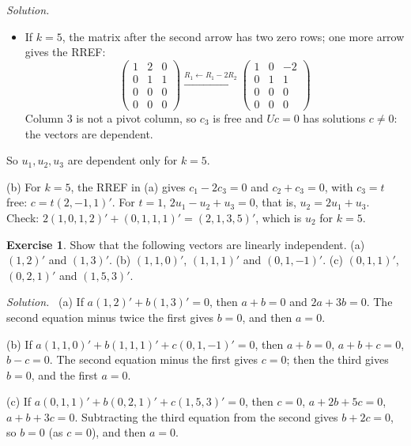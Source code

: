\documentclass[12pt]{article}
\theoremstyle{definition}
\newtheorem{exercise}{Exercise}
\newenvironment{solution}{\par\noindent\textit{Solution.}\ }{\par\smallskip}
\begin{document}
\begin{solution}
\begin{itemize}
\(c=0\) is the only solution (Theorem~\ref{thm:r2-solution-structure}(b)), and \(u_1,u_2,u_3\) are
independent.
\item If \(k=5\), the matrix after the second arrow has two zero rows; one more arrow gives the
RREF:
\[
\begin{pmatrix}1&2&0\\0&1&1\\0&0&0\\0&0&0\end{pmatrix}
\xrightarrow{R_1\leftarrow R_1-2R_2}
\begin{pmatrix}1&0&-2\\0&1&1\\0&0&0\\0&0&0\end{pmatrix}
\]
Column \(3\) is not a pivot column, so \(c_3\) is free and \(Uc=0\) has solutions \(c\ne0\): the
vectors are dependent.
\end{itemize}
So \(u_1,u_2,u_3\) are dependent only for \(k=5\).

(b) For \(k=5\), the RREF in (a) gives \(c_1-2c_3=0\) and \(c_2+c_3=0\), with \(c_3=t\) free: \(c=t(2,-1,1)'\). For \(t=1\),
\(2u_1-u_2+u_3=0\), that is, \(u_2=2u_1+u_3\). Check: \(2(1,0,1,2)'+(0,1,1,1)'=(2,1,3,5)'\), which is
\(u_2\) for \(k=5\).
\end{solution}

\begin{exercise}\label{r3-ex-independent-examples}
Show that the following vectors are linearly independent.
(a) \((1,2)'\) and \((1,3)'\).
(b) \((1,1,0)'\), \((1,1,1)'\) and \((0,1,-1)'\).
(c) \((0,1,1)'\), \((0,2,1)'\) and \((1,5,3)'\).
\end{exercise}
\begin{solution}
(a) If \(a(1,2)'+b(1,3)'=0\), then \(a+b=0\) and \(2a+3b=0\). The second equation minus
twice the first gives \(b=0\), and then \(a=0\).

(b) If \(a(1,1,0)'+b(1,1,1)'+c(0,1,-1)'=0\), then \(a+b=0\), \(a+b+c=0\),
\(b-c=0\). The second equation minus the first gives \(c=0\); then the third gives \(b=0\), and
the first \(a=0\).

(c) If \(a(0,1,1)'+b(0,2,1)'+c(1,5,3)'=0\), then \(c=0\), \(a+2b+5c=0\),
\(a+b+3c=0\). Subtracting the third equation from the second gives \(b+2c=0\), so \(b=0\) (as
\(c=0\)), and then \(a=0\).
\end{solution}
\end{document}
